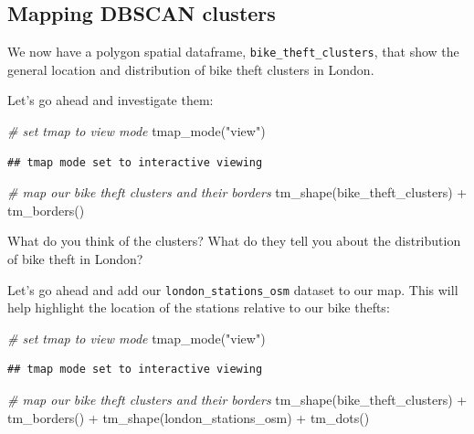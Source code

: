 \documentclass[
]{book}
\newenvironment{Shaded}{\begin{snugshade}}{\end{snugshade}}
\newcommand{\CommentTok}[1]{\textcolor[rgb]{0.56,0.35,0.01}{\textit{#1}}}
\newcommand{\FunctionTok}[1]{\textcolor[rgb]{0.00,0.00,0.00}{#1}}
\newcommand{\NormalTok}[1]{#1}
\newcommand{\SpecialCharTok}[1]{\textcolor[rgb]{0.00,0.00,0.00}{#1}}
\newcommand{\StringTok}[1]{\textcolor[rgb]{0.31,0.60,0.02}{#1}}
\begin{document}
\hypertarget{mapping-dbscan-clusters}{%
\subsection{Mapping DBSCAN clusters}\label{mapping-dbscan-clusters}}

We now have a polygon spatial dataframe, \texttt{bike\_theft\_clusters}, that show the general location and distribution of bike theft clusters in London.

Let's go ahead and investigate them:

\begin{Shaded}
\begin{Highlighting}[]
\CommentTok{\# set tmap to view mode}
\FunctionTok{tmap\_mode}\NormalTok{(}\StringTok{"view"}\NormalTok{)}
\end{Highlighting}
\end{Shaded}

\begin{verbatim}
## tmap mode set to interactive viewing
\end{verbatim}

\begin{Shaded}
\begin{Highlighting}[]
\CommentTok{\# map our bike theft clusters and their borders}
\FunctionTok{tm\_shape}\NormalTok{(bike\_theft\_clusters) }\SpecialCharTok{+}
  \FunctionTok{tm\_borders}\NormalTok{()}
\end{Highlighting}
\end{Shaded}

What do you think of the clusters? What do they tell you about the distribution of bike theft in London?

Let's go ahead and add our \texttt{london\_stations\_osm} dataset to our map. This will help highlight the location of the stations relative to our bike thefts:

\begin{Shaded}
\begin{Highlighting}[]
\CommentTok{\# set tmap to view mode}
\FunctionTok{tmap\_mode}\NormalTok{(}\StringTok{"view"}\NormalTok{)}
\end{Highlighting}
\end{Shaded}

\begin{verbatim}
## tmap mode set to interactive viewing
\end{verbatim}

\begin{Shaded}
\begin{Highlighting}[]
\CommentTok{\# map our bike theft clusters and their borders}
\FunctionTok{tm\_shape}\NormalTok{(bike\_theft\_clusters) }\SpecialCharTok{+} 
  \FunctionTok{tm\_borders}\NormalTok{() }\SpecialCharTok{+}
\FunctionTok{tm\_shape}\NormalTok{(london\_stations\_osm) }\SpecialCharTok{+} 
  \FunctionTok{tm\_dots}\NormalTok{()}
\end{Highlighting}
\end{Shaded}
\end{document}
